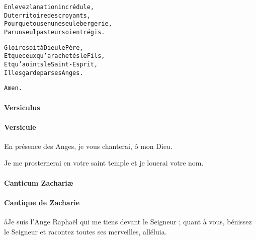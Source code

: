 \documentclass[twoside]{article}
\begin{document}
\begin{paracol}[1]{2}
\begin{alltt}
\newpage

Enlevez la nation incrédule,
Du territoire des croyants,
Pour que tous en une seule bergerie,
Par un seul pasteur soient régis.

Gloire soit à Dieu le Père,
Et que ceux qu’a rachetés le Fils,
Et qu’a oints le Saint-Esprit,
Il les garde par ses Anges.

Amen.
\end{alltt}

\switchcolumn*

\paragraph{Versiculus}


\switchcolumn

\paragraph{Versicule}

\vv En présence des Anges, je vous chanterai, ô mon Dieu.

\rr Je me prosternerai en votre saint temple et je louerai votre nom.

\newpage

\switchcolumn*

\paragraph{Canticum Zachariæ}


\switchcolumn

\paragraph{Cantique de Zacharie}

\aa Je suis l’Ange Raphaël qui me tiens devant le Seigneur ; quant à vous, bénissez le Seigneur et racontez toutes ses merveilles, alléluia.


\switchcolumn*


\end{paracol}
\end{document}
